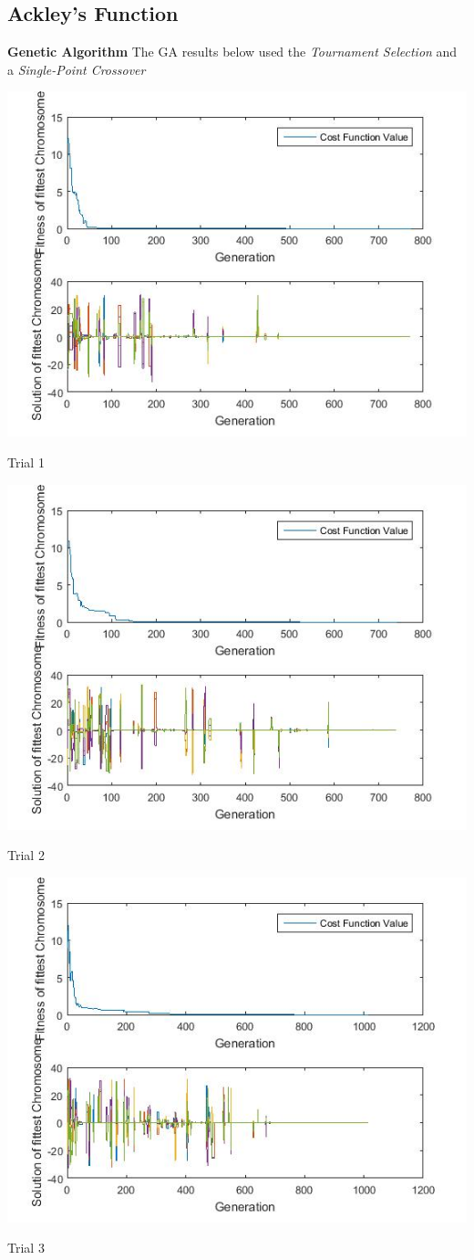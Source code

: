 \documentclass{article}
\begin{document}
\subsection{Ackley's Function}
\textbf{Genetic Algorithm} The GA results below used the \textit{Tournament Selection} and a \textit{Single-Point Crossover}\\
\centerline{\includegraphics[width=0.5\linewidth]{ga_tf5_s1_c1a}}
\centerline{Trial 1}
\centerline{\includegraphics[width=0.5\linewidth]{ga_tf5_s1_c1b}}
\centerline{Trial 2}
\centerline{\includegraphics[width=0.5\linewidth]{ga_tf5_s1_c1c}}
\centerline{Trial 3}
\end{document}
